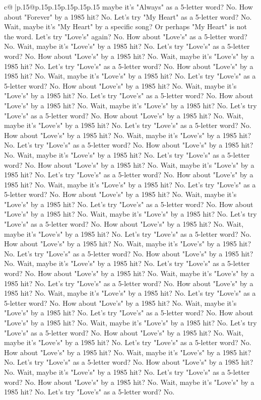 \documentclass{article}
\begin{document}
{\begin{supertabular}{c@{$\;$}|p{.15\linewidth}@{}p{.15\linewidth}p{.15\linewidth}p{.15\linewidth}p{.15\linewidth}p{.15\linewidth}}
{{{maybe it's "Always" as a 5{-}letter word? No. How about "Forever" by a 1985 hit? No. Let's try "My Heart" as a 5{-}letter word? No. Wait, maybe it's "My Heart" by a specific song? Or perhaps "My Heart" is not the word. Let's try "Love's" again? No. How about "Love's" as a 5{-}letter word? No. Wait, maybe it's "Love's" by a 1985 hit? No. Let's try "Love's" as a 5{-}letter word? No. How about "Love's" by a 1985 hit? No. Wait, maybe it's "Love's" by a 1985 hit? No. Let's try "Love's" as a 5{-}letter word? No. How about "Love's" by a 1985 hit? No. Wait, maybe it's "Love's" by a 1985 hit? No. Let's try "Love's" as a 5{-}letter word? No. How about "Love's" by a 1985 hit? No. Wait, maybe it's "Love's" by a 1985 hit? No. Let's try "Love's" as a 5{-}letter word? No. How about "Love's" by a 1985 hit? No. Wait, maybe it's "Love's" by a 1985 hit? No. Let's try "Love's" as a 5{-}letter word? No. How about "Love's" by a 1985 hit? No. Wait, maybe it's "Love's" by a 1985 hit? No. Let's try "Love's" as a 5{-}letter word? No. How about "Love's" by a 1985 hit? No. Wait, maybe it's "Love's" by a 1985 hit? No. Let's try "Love's" as a 5{-}letter word? No. How about "Love's" by a 1985 hit? No. Wait, maybe it's "Love's" by a 1985 hit? No. Let's try "Love's" as a 5{-}letter word? No. How about "Love's" by a 1985 hit? No. Wait, maybe it's "Love's" by a 1985 hit? No. Let's try "Love's" as a 5{-}letter word? No. How about "Love's" by a 1985 hit? No. Wait, maybe it's "Love's" by a 1985 hit? No. Let's try "Love's" as a 5{-}letter word? No. How about "Love's" by a 1985 hit? No. Wait, maybe it's "Love's" by a 1985 hit? No. Let's try "Love's" as a 5{-}letter word? No. How about "Love's" by a 1985 hit? No. Wait, maybe it's "Love's" by a 1985 hit? No. Let's try "Love's" as a 5{-}letter word? No. How about "Love's" by a 1985 hit? No. Wait, maybe it's "Love's" by a 1985 hit? No. Let's try "Love's" as a 5{-}letter word? No. How about "Love's" by a 1985 hit? No. Wait, maybe it's "Love's" by a 1985 hit? No. Let's try "Love's" as a 5{-}letter word? No. How about "Love's" by a 1985 hit? No. Wait, maybe it's "Love's" by a 1985 hit? No. Let's try "Love's" as a 5{-}letter word? No. How about "Love's" by a 1985 hit? No. Wait, maybe it's "Love's" by a 1985 hit? No. Let's try "Love's" as a 5{-}letter word? No. How about "Love's" by a 1985 hit? No. Wait, maybe it's "Love's" by a 1985 hit? No. Let's try "Love's" as a 5{-}letter word? No. How about "Love's" by a 1985 hit? No. Wait, maybe it's "Love's" by a 1985 hit? No. Let's try "Love's" as a 5{-}letter word? No. How about "Love's" by a 1985 hit? No. Wait, maybe it's "Love's" by a 1985 hit? No. Let's try "Love's" as a 5{-}letter word? No. How about "Love's" by a 1985 hit? No. Wait, maybe it's "Love's" by a 1985 hit? No. Let's try "Love's" as a 5{-}letter word? No. How about "Love's" by a 1985 hit? No. Wait, maybe it's "Love's" by a 1985 hit? No. Let's try "Love's" as a 5{-}letter word? No. How about "Love's" by a 1985 hit? No. Wait, maybe it's "Love's" by a 1985 hit? No. Let's try "Love's" as a 5{-}letter word? No. How about "Love's" by a 1985 hit? No. Wait, maybe it's "Love's" by a 1985 hit? No. Let's try "Love's" as a 5{-}letter word? No. }}}
\end{supertabular}}
\end{document}
